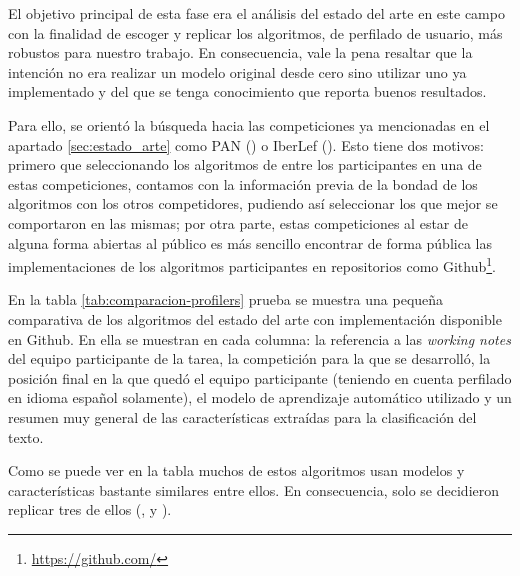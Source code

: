  El objetivo principal de esta fase era el análisis del estado del arte en este campo con la finalidad de escoger y replicar los algoritmos, de perfilado de usuario, más robustos para nuestro trabajo. En consecuencia, vale la pena resaltar que la intención no era realizar un modelo original desde cero sino utilizar uno ya implementado y del que se tenga conocimiento que reporta buenos resultados.
 
 Para ello, se orientó la búsqueda hacia las competiciones ya mencionadas en el apartado \ref{sec:estado_arte} como PAN (\cite{pan:2013}) o IberLef (\cite{iberlef2022}). Esto tiene dos motivos: primero que seleccionando los algoritmos de entre los participantes en una de estas competiciones, contamos con la información previa de la bondad de los algoritmos con los otros competidores, pudiendo así seleccionar los que mejor se comportaron en las mismas; por otra parte, estas competiciones al estar de alguna forma abiertas al público es más sencillo encontrar de forma pública las implementaciones de los algoritmos participantes en repositorios como Github\footnote{\url{https://github.com/}}.
 
En la tabla \ref{tab:comparacion-profilers} prueba se muestra una pequeña comparativa de los algoritmos del estado del arte con implementación disponible en Github. En ella se muestran en cada columna: la referencia a las \textit{working notes} del equipo participante de la tarea, la competición para la que se desarrolló, la posición final en la que quedó el equipo participante (teniendo en cuenta perfilado en idioma español solamente), el modelo de aprendizaje automático utilizado y un resumen muy general de las características extraídas para la clasificación del texto.

Como se puede ver en la tabla muchos de estos algoritmos usan modelos y características bastante similares entre ellos. En consecuencia, solo se decidieron replicar tres de ellos (\cite{loscalis22}, \cite{modaresi:2016} y \cite{grivas2015author}).


